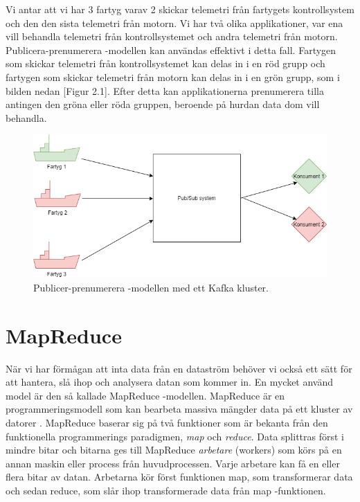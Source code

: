 Vi antar att vi har 3 fartyg varav 2 skickar telemetri från fartygets 
kontrollsystem och den den sista telemetri från motorn. Vi har två
olika applikationer, var ena vill behandla telemetri från kontrollsystemet och
andra telemetri från motorn. Publicera-prenumerera -modellen kan användas
effektivt i detta fall. Fartygen som skickar telemetri från kontrollsystemet
kan delas in i en röd grupp och fartygen som skickar telemetri från motorn
kan delas in i en grön grupp, som i bilden nedan [Figur 2.1]. Efter detta kan applikationerna
prenumerera tilla antingen den gröna eller röda gruppen, beroende på hurdan data
dom vill behandla.

\begin{figure}[h]
    \centering
    \includegraphics[scale=0.7]{img/prod-cons-model.png}
    \caption{Publicer-prenumerera -modellen med ett Kafka kluster.}
    \label{fig:mesh1}
\end{figure}

\section{MapReduce}
När vi har förmågan att inta data från en dataström behöver vi också ett sätt för att hantera, slå ihop och analysera datan som kommer in. En mycket använd model är den så kallade MapReduce -modellen. MapReduce är en programmeringsmodell som kan bearbeta massiva mängder data på ett kluster av datorer \citep{dean2008mapreduce}. MapReduce baserar sig på två funktioner 
som är bekanta från den funktionella programmerings paradigmen, \textit{map} och \textit{reduce}. Data splittras först i mindre bitar och bitarna ges till MapReduce \textit{arbetare} (workers) som körs på en annan maskin eller process från huvudprocessen. Varje arbetare
kan få en eller flera bitar av datan. Arbetarna kör först funktionen map, som transformerar data och sedan reduce, som slår ihop transformerade data från map -funktionen.


